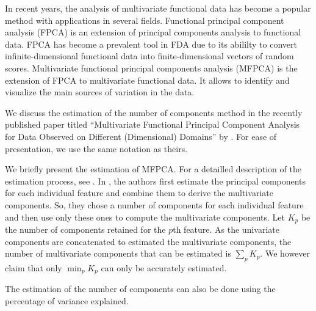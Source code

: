 
In recent years, the analysis of multivariate functional data has become a popular method with applications in several fields. Functional principal component analysis (FPCA) is an extension of principal components analysis to functional data. FPCA has become a prevalent tool in FDA due to its abililty to convert infinite-dimensional functional data into finite-dimensional vectors of random scores. Multivariate functional principal components analysis (MFPCA) is the extension of FPCA to multivariate functional data. It allows to identify and visualize the main sources of variation in the data. 

We discuss the estimation of the number of components method in the recently published paper titled ``Multivariate Functional Principal Component Analysis for Data Observed on Different (Dimensional) Domains'' by \cite{happMultivariateFunctionalPrincipal2018a}. For ease of presentation, we use the same notation as theirs.


We briefly present the estimation of MFPCA. For a detailled description of the estimation process, see \cite[Section 3]{happMultivariateFunctionalPrincipal2018a}. In \cite{happMultivariateFunctionalPrincipal2018a}, the authors first estimate the principal components for each individual feature and combine them to derive the multivariate components. So, they chose a number of components for each individual feature and then use only these ones to compute the multivariate components. Let $K_p$ be the number of components retained for the $p$th feature. As the univariate components are concatenated to estimated the multivariate components, the number of multivariate components that can be estimated is $\sum_p K_p$. We however claim that only $\min_p K_p$ can only be accurately estimated.

The estimation of the number of components can also be done using the percentage of variance explained. 

